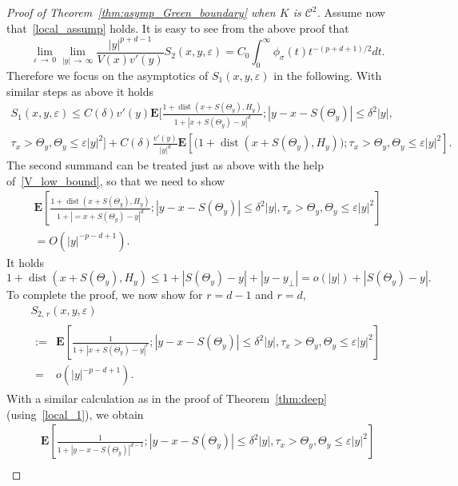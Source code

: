 \documentclass[10pt]{amsart}
\theoremstyle{definition}\newtheorem{defi}[theo]{Definition}\newtheorem{rema}[theo]{Remark}\newtheorem{exam}[theo]{Example}\newtheorem{exem}[theo]{Example}\newtheorem{nota}[theo]{Notation}
\DeclareMathOperator{\dist}{dist}
\newcommand{\clC}{\mathcal{C}}
\newcommand{\e}{\mathbf{E}}
\renewcommand{\le}{\leqslant}
\begin{document}
\begin{proof}[Proof of Theorem~\ref{thm:asymp_Green_boundary} when $K$ is $\clC^{2}$]
Assume now that~\eqref{local_assump} holds. It is easy to see from the above proof that
\begin{equation}
\lim_{\varepsilon\,\to\,0}\lim_{|y|\,\to\,\infty}\frac{|y|^{p+d-1}}{V(x)v'(y)}S_2(x,y,\varepsilon) =C_0\int_0^\infty \phi_\sigma(t) t^{-(p+d+1)/2}dt.
\end{equation}
Therefore we focus on the asymptotics of $S_1(x,y,\varepsilon)$ in the following. With similar steps as above it holds
\begin{multline*}
S_1(x,y,\varepsilon)
\le C(\delta)v'(y)\e\bigg[\frac{1+\dist\left(x+S\left(\Theta_y\right),H_y\right)}{1+\left|x+S\left(\Theta_y\right)-y\right|^d};\left|y-x-S\left(\Theta_y\right)\right|\le\delta^2|y|,\\
\tau_x>\Theta_y,\Theta_y\le\varepsilon|y|^2\!\bigg]\!
+ C(\delta)\frac{v'(y)}{|y|^d}\e\left[\big(1+\dist\left(x+S\left(\Theta_y\right),H_y\right)\!\!\big);
\tau_x>\Theta_y,\Theta_y\le\varepsilon|y|^2\right]\!.
\end{multline*}
The second summand can be treated just as above with the help of~\eqref{V_low_bound}, so that we need to show
\begin{multline*}
\e\left[\frac{1+\dist\left(x+S\left(\Theta_y\right),H_y\right)}{1+\left|=x+S\left(\Theta_y\right)-y\right|^d};\left|y-x-S\left(\Theta_y\right)\right|\le\delta^2|y|,\tau_x>\Theta_y,\Theta_y\le\varepsilon|y|^2\right]\\
= O\left(|y|^{-p-d+1}\right).
\end{multline*}
It holds
\[
1+\dist\left(x+S\left(\Theta_y\right),H_y\right)\le 1+\left|S\left(\Theta_y\right)-y\right|+\left|y-y_{\perp}\right|= o(|y|)+\left|S\left(\Theta_y\right)-y\right|.
\]
To complete the proof, we now show for $r = d-1$ and $r=d$,
\begin{multline*}\label{eq:helpass4}
S_{2,\,r}(x,y,\varepsilon)\\
\begin{aligned}
:=& \e\left[\frac{1}{1+\left|x+S\left(\Theta_y\right)-y\right|^{r}};\left|y-x-S\left(\Theta_y\right)\right|\le\delta^2|y|,\tau_x>\Theta_y,\Theta_y\le\varepsilon|y|^2\right]\\
 =& o\left(|y|^{-p-d+1}\right).
\end{aligned}
\end{multline*}
With a similar calculation as in the proof of Theorem~\ref{thm:deep} (using~\eqref{local_1}), we obtain
\begin{multline*}
\e\left[\frac{1}{1+\left|y-x-S\left(\Theta_y\right)\right|^{d-1}};\left|y-x-S\left(\Theta_y\right)\right|\le\delta^2|y|,\tau_x>\Theta_y,\Theta_y\le\varepsilon|y|^2\right]\\

\end{multline*}
\end{proof}
\end{document}
